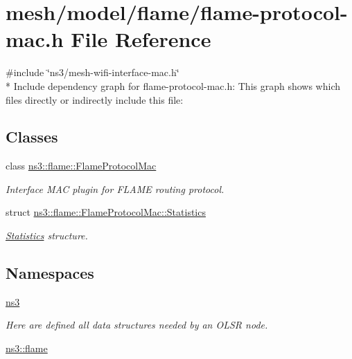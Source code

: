 \hypertarget{flame-protocol-mac_8h}{}\section{mesh/model/flame/flame-\/protocol-\/mac.h File Reference}
\label{flame-protocol-mac_8h}
{\ttfamily \#include \char`\"{}ns3/mesh-\/wifi-\/interface-\/mac.\+h\char`\"{}}\\*
Include dependency graph for flame-\/protocol-\/mac.h\+:
This graph shows which files directly or indirectly include this file\+:
\subsection*{Classes}
\begin{DoxyCompactItemize}
\item 
class \hyperlink{classns3_1_1flame_1_1FlameProtocolMac}{ns3\+::flame\+::\+Flame\+Protocol\+Mac}
\begin{DoxyCompactList}\small\item\em Interface M\+AC plugin for F\+L\+A\+ME routing protocol. \end{DoxyCompactList}\item 
struct \hyperlink{structns3_1_1flame_1_1FlameProtocolMac_1_1Statistics}{ns3\+::flame\+::\+Flame\+Protocol\+Mac\+::\+Statistics}
\begin{DoxyCompactList}\small\item\em \hyperlink{structns3_1_1flame_1_1FlameProtocolMac_1_1Statistics}{Statistics} structure. \end{DoxyCompactList}\end{DoxyCompactItemize}
\subsection*{Namespaces}
\begin{DoxyCompactItemize}
\item 
 \hyperlink{namespacens3}{ns3}
\begin{DoxyCompactList}\small\item\em Here are defined all data structures needed by an O\+L\+SR node. \end{DoxyCompactList}\item 
 \hyperlink{namespacens3_1_1flame}{ns3\+::flame}
\end{DoxyCompactItemize}
